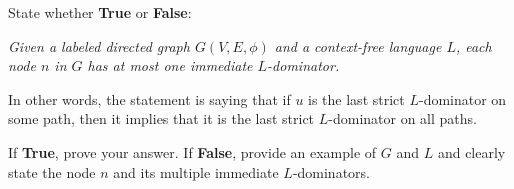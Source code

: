 \documentclass[12pt]{article}
\begin{document}
\begin{enumerate}
      State whether \textbf{True} or \textbf{False}: 
    
      \emph{Given a labeled directed graph $G(V,E, \phi)$ and a context-free
      language $L$, each node $n$ in $G$ has at most one immediate $L$-dominator.}

      In other words, the statement is saying that if $u$ is the last strict
      $L$-dominator on some path, then it implies that it is the last strict
      $L$-dominator on all paths. 
    
      If \textbf{True}, prove your answer. If \textbf{False}, provide an example
      of $G$ and $L$ and clearly state the node $n$ and its multiple immediate
      $L$-dominators.
      \begin{mdframed}
      \vspace{3em}
      \end{mdframed}
      
  \end{enumerate}
    
\end{document}
